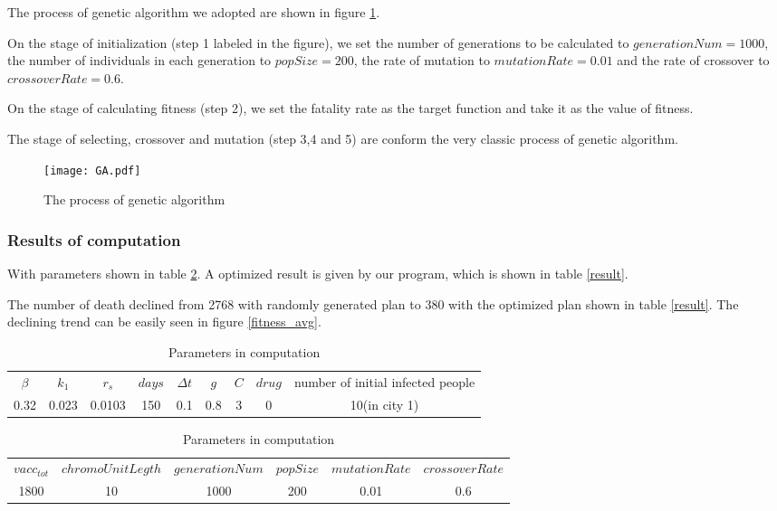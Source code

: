 The process of genetic algorithm we adopted are shown in figure \ref{GA}.

On the stage of initialization (step 1 labeled in the figure), we set the number of generations to be calculated to $generationNum = 1000$, the number of individuals in each generation to $popSize = 200$, the rate of mutation to $mutationRate = 0.01$ and the rate of crossover to $crossoverRate = 0.6$.

On the stage of calculating fitness (step 2), we set the fatality rate as the target function and take it as the value of fitness.

The stage of selecting, crossover and mutation (step 3,4 and 5) are conform the very classic process of genetic algorithm.

\begin{figure}
\centering
\texttt{[image: GA.pdf]}
\caption{The process of genetic algorithm}
\label{GA}
\end{figure}

\subsubsection{Results of computation}
With parameters shown in table \ref{comppara}. A optimized result is given by our program, which is shown in table \ref{result}. 

The number of death declined from 2768 with randomly generated plan to 380 with the optimized plan shown in table \ref{result}. The declining trend can be easily seen in figure \ref{fitness_avg}.

\begin{table}[]
\centering
\begin{tabular}{ccccccccc}
\hline
$\beta$ &$k_1$      &$r_s$  &$days$ &$\Delta t$ &$g$    &$C$    &$drug$ & number of initial infected people\\
 0.32   &0.023      &0.0103 &150    &0.1        &0.8    &3  &0 & 10(in city 1)\\
\hline
\end{tabular}
\begin{tabular}{cccccc}
\hline
$vacc_{tot}$&$chromoUnitLegth$ & $generationNum$ &$popSize$  &$mutationRate$ &$crossoverRate$ \\
1800 &10 &1000            &200        &0.01           &0.6 \\
\hline
\end{tabular}
\caption{Parameters in computation}
\label{comppara}
\end{table}

